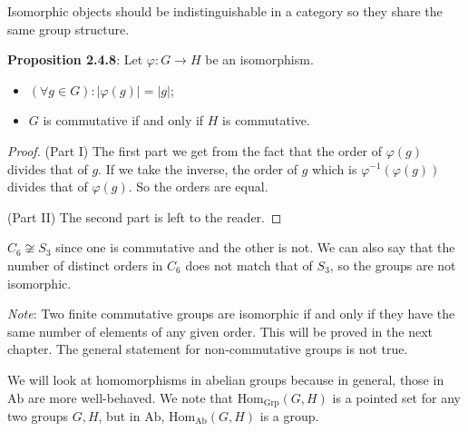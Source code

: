 \documentclass{report}
\begin{document}
Isomorphic objects should be indistinguishable in a category so they share the same group structure.

\textbf{Proposition 2.4.8}: Let $\varphi : G \rightarrow H$ be an isomorphism.
    \begin{itemize}
        \item $(\forall g \in G) : \lvert \varphi(g) \rvert = \lvert g \rvert$;

        \item $G$ is commutative if and only if $H$ is commutative. 
    \end{itemize}
    \begin{proof}
        (Part I) The first part we get from the fact that the order of $\varphi(g)$ divides that of $g$. If we take the inverse, the order of $g$ which is $\varphi^{-1}(\varphi(g))$ divides that of $\varphi(g)$. So the orders are equal.

        (Part II) The second part is left to the reader.
    \end{proof}

\begin{examples}
    \begin{example}[\label{exm:2.4.9}]
        $C_{6} \not\cong S_{3}$ since one is commutative and the other is not. We can also say that the number of distinct orders in $C_{6}$ does not match that of $S_{3}$, so the groups are not isomorphic.

        \textit{Note}: Two finite commutative groups are isomorphic if and only if they have the same number of elements of any given order. This will be proved in the next chapter. The general statement for non-commutative groups is not true.
    \end{example}
\end{examples}

We will look at homomorphisms in abelian groups because in general, those in $\text{Ab}$ are more well-behaved. We note that $\text{Hom}_{\text{Grp}}(G, H)$ is a pointed set for any two groups $G, H$, but in $\text{Ab}$, $\text{Hom}_{\text{Ab}}(G, H)$ is a group.
\end{document}
